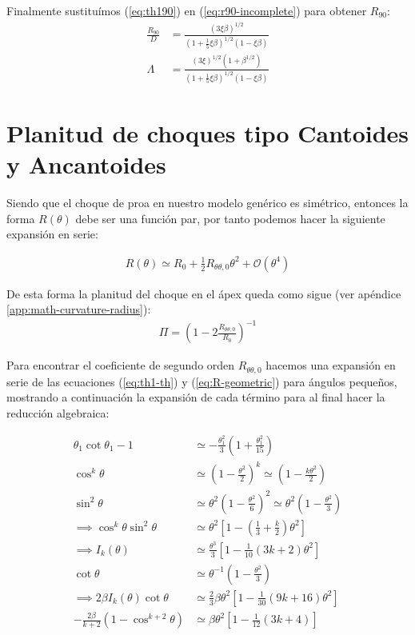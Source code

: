 Finalmente sustituímos (\ref{eq:th190}) en (\ref{eq:r90-incomplete}) para obtener $R_{90}$:
\begin{align}
  \frac{R_{90}}{D} &= \frac{\left(3\xi\beta\right)^{1/2}}{\left(1+\frac{1}{5}\xi\beta\right)^{1/2}\left(1-\xi\beta\right)} \\
  \Lambda &= \frac{\left(3\xi\right)^{1/2}\left(1+\beta^{1/2}\right)}
                   {\left(1+\frac{1}{5}\xi\beta\right)^{1/2}\left(1-\xi\beta\right)} 
\end{align}

\section[Planitud]{Planitud de choques tipo Cantoides y Ancantoides}

Siendo que el choque de proa en nuestro modelo genérico es simétrico, entonces la forma $R(\theta)$ debe ser una función par,
por tanto podemos hacer la siguiente expansión en serie:

\begin{align}
  R(\theta) \simeq R_0 + \frac{1}{2}R_{\theta\theta, 0}\theta^2 + \mathcal{O}(\theta^4)
\end{align}

De esta forma la planitud del choque en el ápex queda como sigue (ver apéndice \ref{app:math-curvature-radius}):
\begin{align}
  \Pi = \left(1 - 2\frac{R_{\theta \theta, 0}}{R_0}\right)^{-1}
\end{align}

Para encontrar el coeficiente de segundo orden $R_{\theta \theta, 0}$ hacemos una expansión en serie de las ecuaciones (\ref{eq:th1-th}) y
(\ref{eq:R-geometric}) para ángulos pequeños, mostrando a continuación la expansión de cada término para al final hacer la
reducción algebraica:

\begin{align}
  \theta_1\cot\theta_1 -1 &\simeq -\frac{\theta^2_1}{3}\left(1 + \frac{\theta^2_1}{15}\right) \\
  \cos^k\theta &\simeq \left(1 - \frac{\theta^2}{2}\right)^k \simeq \left(1 - \frac{k\theta^2}{2}\right) \\
  \sin^2\theta &\simeq \theta^2\left(1 - \frac{\theta^2}{6}\right)^2 \simeq \theta^2\left(1 - \frac{\theta^2}{3}\right)\\
  \implies \cos^k\theta\sin^2\theta &\simeq \theta^2\left[1 - \left(\frac{1}{3} + \frac{k}{2}\right)\theta^2\right] \\
  \implies I_k(\theta) &\simeq \frac{\theta^3}{3}\left[1 - \frac{1}{10}\left(3k + 2\right)\theta^2\right] \\
  \cot\theta &\simeq \theta^{-1}\left(1 - \frac{\theta^2}{3}\right) \\
  \implies 2\beta I_k(\theta)\cot\theta &\simeq \frac{2}{3}\beta\theta^2\left[1 - \frac{1}{30}\left(9k + 16\right)\theta^2\right] \\
  -\frac{2\beta}{k+2}\left(1 - \cos^{k+2}\theta\right) &\simeq \beta\theta^2\left[1 - \frac{1}{12}\left(3k+4\right)\right]
\end{align}

